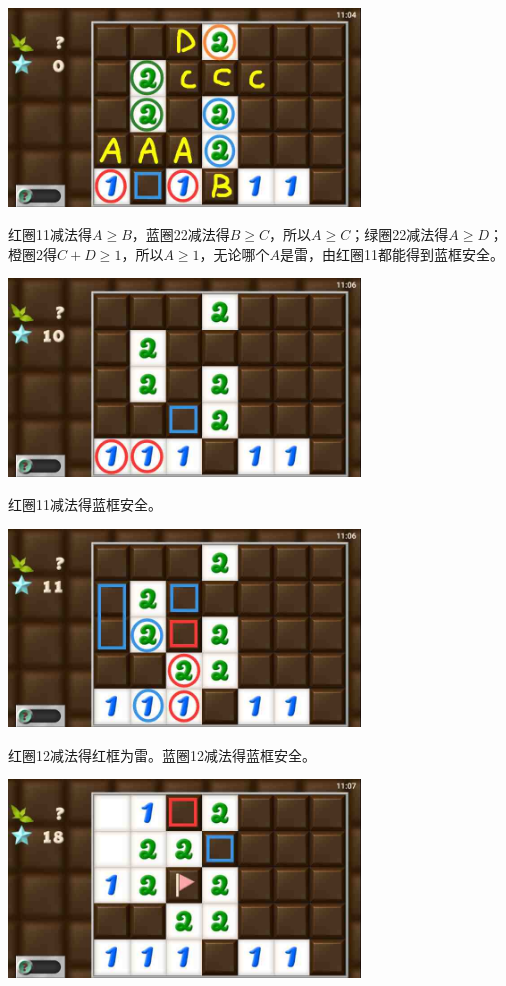 \subsection{} %
\begin{center}
    \includegraphics[width=0.7\textwidth]{puzzlelow/213-1.jpg}
\end{center}
红圈11减法得$A\ge B$，蓝圈22减法得$B\ge C$，所以$A\ge C$；绿圈22减法得$A\ge D$；橙圈2得$C+D\ge 1$，所以$A\ge 1$，无论哪个$A$是雷，由红圈11都能得到蓝框安全。
\begin{center}
    \includegraphics[width=0.7\textwidth]{puzzlelow/213-2.jpg}
\end{center}
红圈11减法得蓝框安全。
\begin{center}
    \includegraphics[width=0.7\textwidth]{puzzlelow/213-3.jpg}
\end{center}
红圈12减法得红框为雷。蓝圈12减法得蓝框安全。
\begin{center}
    \includegraphics[width=0.7\textwidth]{puzzlelow/213-4.jpg}
\end{center}
